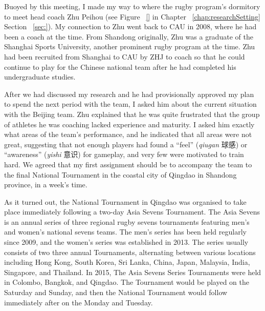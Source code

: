 \begin{CJK}{UTF8}{gbsn}
Buoyed by this meeting, I made my way to where the rugby program's dormitory to meet head coach Zhu Peihou (see Figure ~\ref{} in Chapter ~\ref{chap:researchSetting} Section ~\ref{sec:}).  My connection to Zhu went back to CAU in 2008, where he had been a coach at the time.  From Shandong originally, Zhu was a graduate of the Shanghai Sports University, another prominent rugby program at the time.  Zhu had been recruited from Shanghai to CAU by ZHJ to coach so that he could continue to play for the Chinese national team after he had completed his undergraduate studies.

After we had discussed my research and he had provisionally approved my plan to spend the next period with the team, I asked him about the current situation with the Beijing team.  Zhu explained that he was quite frustrated that the group of athletes he was coaching lacked experience and maturity. I asked him exactly what areas of the team's performance, and he indicated that all areas were not great, suggesting that not enough players had found a ``feel'' (\textit{qiugan} 球感) or ``awareness'' (\textit{yishi} 意识) for gameplay, and very few were motivated to train hard.  We agreed that my first assignment should be to accompany the team to the final National Tournament in the coastal city of Qingdao in Shandong province, in a week's time.

As it turned out, the National Tournament in Qingdao was organised to take place immediately following a two-day Asia Sevens Tournament.  The Asia Sevens is an annual series of three regional rugby sevens tournaments featuring men's and women's national sevens teams.  The men's series has been held regularly since 2009, and the women's series was established in 2013. The series usually consists of two three annual Tournaments, alternating between various locations including Hong Kong, South Korea, Sri Lanka, China, Japan, Malaysia, India, Singapore, and Thailand.  In 2015, The Asia Sevens Series Tournaments were held in Colombo, Bangkok, and Qingdao. The Tournament would be played on the Saturday and Sunday, and then the National Tournament would follow immediately after on the Monday and Tuesday.


\end{CJK}
